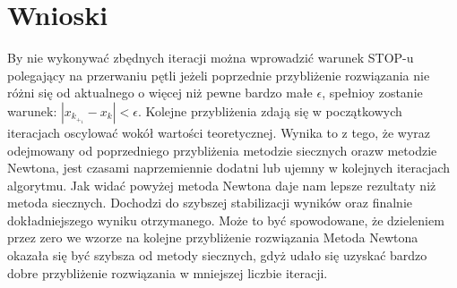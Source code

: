 \documentclass{article}
\begin{document}
\section{Wnioski}
\begin{flushleft}

By nie wykonywać zbędnych iteracji można wprowadzić warunek STOP-u polegający na przerwaniu pętli jeżeli
poprzednie przybliżenie rozwiązania nie różni się od aktualnego o więcej niż pewne bardzo małe $\epsilon$, spełnioy zostanie warunek: $|x_k_+_1-x_k| < \epsilon$.
\newline\newline
Kolejne przybliżenia zdają się w początkowych iteracjach oscylować wokół wartości teoretycznej. Wynika to z tego, że wyraz odejmowany od poprzedniego przybliżenia metodzie siecznych orazw metodzie Newtona, jest czasami naprzemiennie dodatni lub ujemny w kolejnych iteracjach algorytmu.
\newline\newline
Jak widać powyżej metoda Newtona daje nam lepsze rezultaty niż metoda siecznych. Dochodzi do szybszej stabilizacji wyników oraz finalnie dokładniejszego wyniku otrzymanego. Może to być spowodowane, że dzieleniem przez zero we wzorze na kolejne przybliżenie rozwiązania
\newline\newline
Metoda Newtona okazała się być szybsza od metody siecznych, gdyż udało się uzyskać bardzo dobre przybliżenie rozwiązania w mniejszej liczbie iteracji.

\end{flushleft}
\end{document}
